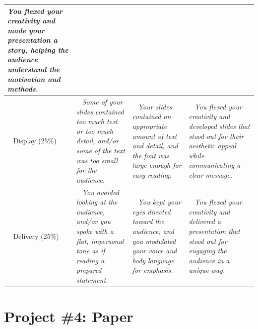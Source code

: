 \documentclass{article}
\begin{document}
\begin{tabular}{|>{\centering\arraybackslash}p{2.5cm}|>{\centering\arraybackslash}p{5cm}|>{\centering\arraybackslash}p{5cm}|>{\centering\arraybackslash}p{5cm}|}
          \it You flexed your creativity and made your presentation a story, helping the audience understand the motivation and methods.
          \newline ~\\
        \hline
        ~ \newline
        Display \newline (25\%)
          \newline ~ & ~ \newline
          \it Some of your slides contained too much text or too much detail, and/or some of the text was too small for the audience.
          \newline ~ & ~ \newline
          \it Your slides contained an appropriate amount of text and detail, and the font was large enough for easy reading.
          \newline ~ & ~ \newline
          \it You flexed your creativity and developed slides that stood out for their aesthetic appeal while communicating a clear message.
          \newline ~\\
        \hline
        ~ \newline
        Delivery \newline (25\%)
          \newline ~ & ~ \newline
          \it You avoided looking at the audience, and/or you spoke with a flat, impersonal tone as if reading a prepared statement.
          \newline ~ & ~ \newline
          \it You kept your eyes directed toward the audience, and you modulated your voice and body language for emphasis.
          \newline ~ & ~ \newline
          \it You flexed your creativity and delivered a presentation that stood out for engaging the audience in a unique way.
          \newline ~\\
        \hline
      \end{tabular}
    \vspace{5mm}

  \newpage
  \section*{\sc Project \#4: Paper}
\end{document}
